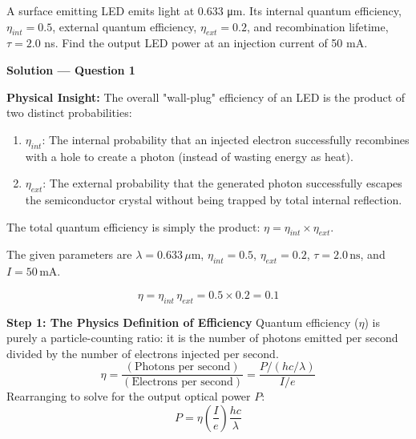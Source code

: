 
\begin{question}[Question 1]
A surface emitting LED emits light at 0.633 \si{\micro\meter}. Its internal quantum efficiency, $\eta_{int} = 0.5$, external quantum efficiency, $\eta_{ext} = 0.2$, and recombination lifetime, $\tau = 2.0$ ns. Find the output LED power at an injection current of 50 mA.
\end{question}

\textbf{\large Solution --- Question 1}

\textbf{Physical Insight:}
The overall "wall-plug" efficiency of an LED is the product of two distinct probabilities:
\begin{enumerate}
  \item $\eta_{int}$: The internal probability that an injected electron successfully recombines with a hole to create a photon (instead of wasting energy as heat).
  \item $\eta_{ext}$: The external probability that the generated photon successfully escapes the semiconductor crystal without being trapped by total internal reflection.
\end{enumerate}
The total quantum efficiency is simply the product: $\eta = \eta_{int} \times \eta_{ext}$.

The given parameters are $\lambda = 0.633\,\mu\text{m}$, $\eta_{int} = 0.5$, $\eta_{ext} = 0.2$, $\tau = 2.0\,\text{ns}$, and $I = 50\,\text{mA}$.

\begin{equation*}
  \eta = \eta_{int}\,\eta_{ext} = 0.5 \times 0.2 = 0.1
\end{equation*}

\textbf{Step 1: The Physics Definition of Efficiency}
Quantum efficiency ($\eta$) is purely a particle-counting ratio: it is the number of photons emitted per second divided by the number of electrons injected per second.
\begin{equation*}
  \eta = \frac{(\text{Photons per second})}{(\text{Electrons per second})} = \frac{P / (hc/\lambda)}{I / e}
\end{equation*}
Rearranging to solve for the output optical power $P$:
\begin{equation*}
  P = \eta \left(\frac{I}{e}\right) \frac{hc}{\lambda}
\end{equation*}

